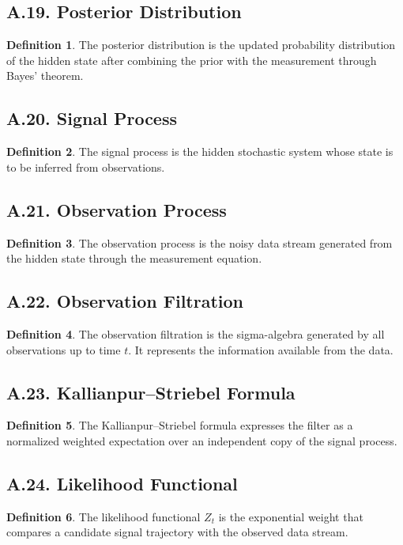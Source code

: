 \documentclass[11pt]{article}
\theoremstyle{definition}
\newtheorem{definition}{Definition}
\theoremstyle{remark}
\begin{document}
\subsection*{A.19. Posterior Distribution}
\begin{definition}
The posterior distribution is the updated probability distribution of the hidden state after combining the prior with the measurement through Bayes' theorem.
\end{definition}

\subsection*{A.20. Signal Process}
\begin{definition}
The signal process is the hidden stochastic system whose state is to be inferred from observations.
\end{definition}

\subsection*{A.21. Observation Process}
\begin{definition}
The observation process is the noisy data stream generated from the hidden state through the measurement equation.
\end{definition}

\subsection*{A.22. Observation Filtration}
\begin{definition}
The observation filtration is the sigma-algebra generated by all observations up to time \(t\). It represents the information available from the data.
\end{definition}

\subsection*{A.23. Kallianpur--Striebel Formula}
\begin{definition}
The Kallianpur--Striebel formula expresses the filter as a normalized weighted expectation over an independent copy of the signal process.
\end{definition}

\subsection*{A.24. Likelihood Functional}
\begin{definition}
The likelihood functional \(Z_t\) is the exponential weight that compares a candidate signal trajectory with the observed data stream.
\end{definition}
\end{document}
